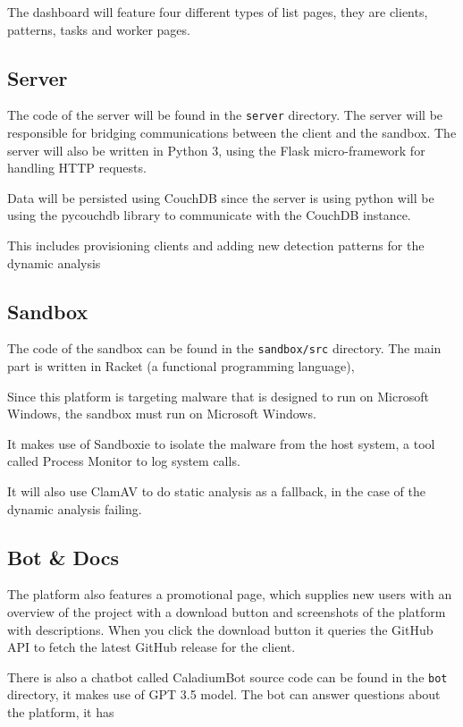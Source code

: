 The dashboard will feature four different types of list pages,
they are clients, patterns, tasks and worker pages.

\subsection{Server}
The code of the server will be found in the \texttt{server} directory.
The server will be responsible for bridging communications between the client and the sandbox.
The server will also be written in Python 3, using the Flask micro-framework for handling HTTP requests.

Data will be persisted using CouchDB since the server is using
python will be using the pycouchdb library to communicate with the
CouchDB instance.

This includes provisioning clients and adding new detection patterns for the dynamic analysis

\subsection{Sandbox}
The code of the sandbox can be found in the \texttt{sandbox/src} directory.
The main part is written in Racket (a functional programming language),

Since this platform is targeting malware that is designed
to run on Microsoft Windows, the sandbox must run on Microsoft Windows.

It makes use of Sandboxie to isolate the malware from the host system,
a tool called Process Monitor to log system calls.

It will also use ClamAV to do static analysis as a fallback, in the case of the dynamic analysis failing.

\subsection{Bot \& Docs}
The platform also features a promotional page,
which supplies new users with an overview of the project with a download button
and screenshots of the platform with descriptions.
When you click the download button it queries the GitHub API to fetch the latest
GitHub release for the client.

There is also a chatbot called CaladiumBot source code can be found in the 
\texttt{bot} directory, it makes use of GPT 3.5 model. \cite{openai}
The bot can answer questions about the platform,
it has 



